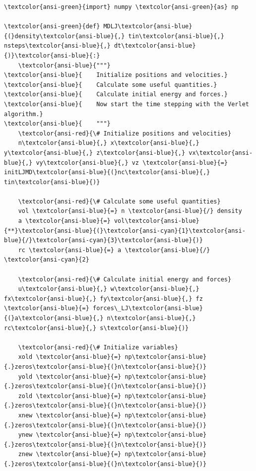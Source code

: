 \documentclass[11pt]{article}
\begin{document}
    
    \begin{Verbatim}[commandchars=\\\{\}]
\textcolor{ansi-green}{import} numpy \textcolor{ansi-green}{as} np

\textcolor{ansi-green}{def} MDLJ\textcolor{ansi-blue}{(}density\textcolor{ansi-blue}{,} tin\textcolor{ansi-blue}{,} nsteps\textcolor{ansi-blue}{,} dt\textcolor{ansi-blue}{)}\textcolor{ansi-blue}{:}
    \textcolor{ansi-blue}{"""}
\textcolor{ansi-blue}{    Initialize positions and velocities.}
\textcolor{ansi-blue}{    Calculate some useful quantities.}
\textcolor{ansi-blue}{    Calculate initial energy and forces.}
\textcolor{ansi-blue}{    Now start the time stepping with the Verlet algorithm.}
\textcolor{ansi-blue}{    """}
    \textcolor{ansi-red}{\# Initialize positions and velocities}
    n\textcolor{ansi-blue}{,} x\textcolor{ansi-blue}{,} y\textcolor{ansi-blue}{,} z\textcolor{ansi-blue}{,} vx\textcolor{ansi-blue}{,} vy\textcolor{ansi-blue}{,} vz \textcolor{ansi-blue}{=} initLJMD\textcolor{ansi-blue}{(}nc\textcolor{ansi-blue}{,} tin\textcolor{ansi-blue}{)}

    \textcolor{ansi-red}{\# Calculate some useful quantities}
    vol \textcolor{ansi-blue}{=} n \textcolor{ansi-blue}{/} density
    a \textcolor{ansi-blue}{=} vol\textcolor{ansi-blue}{**}\textcolor{ansi-blue}{(}\textcolor{ansi-cyan}{1}\textcolor{ansi-blue}{/}\textcolor{ansi-cyan}{3}\textcolor{ansi-blue}{)}
    rc \textcolor{ansi-blue}{=} a \textcolor{ansi-blue}{/} \textcolor{ansi-cyan}{2}

    \textcolor{ansi-red}{\# Calculate initial energy and forces}
    u\textcolor{ansi-blue}{,} w\textcolor{ansi-blue}{,} fx\textcolor{ansi-blue}{,} fy\textcolor{ansi-blue}{,} fz \textcolor{ansi-blue}{=} forces\_LJ\textcolor{ansi-blue}{(}a\textcolor{ansi-blue}{,} n\textcolor{ansi-blue}{,} rc\textcolor{ansi-blue}{,} s\textcolor{ansi-blue}{)}

    \textcolor{ansi-red}{\# Initialize variables}
    xold \textcolor{ansi-blue}{=} np\textcolor{ansi-blue}{.}zeros\textcolor{ansi-blue}{(}n\textcolor{ansi-blue}{)}
    yold \textcolor{ansi-blue}{=} np\textcolor{ansi-blue}{.}zeros\textcolor{ansi-blue}{(}n\textcolor{ansi-blue}{)}
    zold \textcolor{ansi-blue}{=} np\textcolor{ansi-blue}{.}zeros\textcolor{ansi-blue}{(}n\textcolor{ansi-blue}{)}
    xnew \textcolor{ansi-blue}{=} np\textcolor{ansi-blue}{.}zeros\textcolor{ansi-blue}{(}n\textcolor{ansi-blue}{)}
    ynew \textcolor{ansi-blue}{=} np\textcolor{ansi-blue}{.}zeros\textcolor{ansi-blue}{(}n\textcolor{ansi-blue}{)}
    znew \textcolor{ansi-blue}{=} np\textcolor{ansi-blue}{.}zeros\textcolor{ansi-blue}{(}n\textcolor{ansi-blue}{)}
    

\end{Verbatim}
\end{document}
